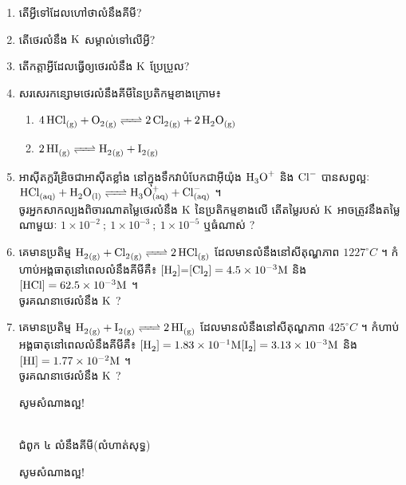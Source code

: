 \documentclass[12pt, a5paper]{article}
\begin{document}
\maketitle
\begin{enumerate}[m]
	\item តើអ្វីទៅដែលហៅថាលំនឹងគីមី?
	\item តើថេរលំនឹង $\ce{K}$ សម្គាល់ទៅលើអ្វី?
	\item តើកត្តាអ្វីដែលធ្វើឲ្យថេរលំនឹង $\ce{K}$ ប្រែប្រួល?
	\item សរសេរកន្សោមថេរលំនឹងគីមីនៃប្រតិកម្មខាងក្រោម៖
	\begin{enumerate}[k]
		\item $ \ce{4HCl_{(g)} + O2_{(g)} <=> 2Cl2_{(g)} + 2H2O_{(g)}} $
		\item 
		$ \ce{2HI_{(g)} <=> H2_{(g)} + I2_{(g)}} $
	\end{enumerate}
	\item អាស៊ីតក្លរីឌ្រិចជាអាស៊ីតខ្លាំង នៅក្នុងទឹកវាបំបែកជាអ៊ីយ៉ុង $\ce{H3O+}$ និង $\ce{Cl-}$ បានសព្វល្អៈ~~
	$\ce{HCl_{(aq)} + H2O_{(l)} <=> H3O^+_{(aq)} + Cl^-_{(aq)}} $ ។\\
	ចូរអ្នកសាកល្បងពិចារណាតម្លៃថេរលំនឹង $\ce{K}$ នៃប្រតិកម្មខាងលើ តើតម្លៃរបស់ $\ce{K}$ អាចត្រូវនឹងតម្លៃណាមួយៈ  $1\times10^{-2}~;~1\times10^{-3}~;~1\times10^{-5}$ ឬធំណាស់ ?
	\item គេមានប្រតិម្ម $\ce{H2_{(g)} + Cl2_{(g)} <=> 2HCl_{(g)}}$ ដែលមានលំនឹងនៅសីតុណ្ហភាព $1227^\circ C$ ។ កំហាប់អង្គធាតុនៅពេលលំនឹងគីមីគឺ៖ $\ce{[H2]=[Cl2]}=4.5\times10^{-3}\ce{M}$ និង $\ce{[HCl]}=62.5\times10^{-3}\ce{M}$ ។\\
	ចូរគណនាថេរលំនឹង $\ce{K}$ ? 
	\item គេមានប្រតិម្ម $\ce{H2_{(g)} + I2_{(g)} <=> 2HI_{(g)}}$ ដែលមានលំនឹងនៅសីតុណ្ហភាព $425^\circ C$ ។ កំហាប់អង្គធាតុនៅពេលលំនឹងគីមីគឺ៖ $\ce{[H2]}=1.83\times10^{-1}\ce{M}\\\ce{[I2]}=3.13\times10^{-3}\ce{M}$ និង $\ce{[HI]}=1.77\times10^{-2}\ce{M}$ ។\\
	ចូរគណនាថេរលំនឹង $\ce{K}$ ? 
	\begin{center}
		\sffamily\color{black}
		សូមសំណាងល្អ!
	\end{center}\newpage
	\begin{center}
		\sffamily\color{black}
		\\
		ជំពូក ៤ លំនឹងគីមី(លំហាត់សុទ្ធ)
	\end{center} 
	\begin{center}
		\sffamily\color{black}
		សូមសំណាងល្អ!
	\end{center}\newpage
\end{enumerate}
\end{document}
